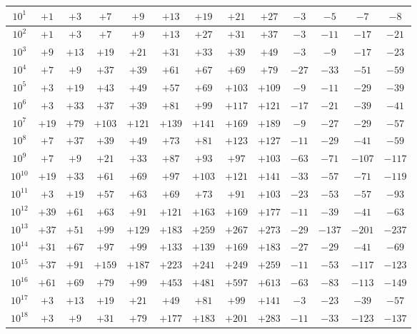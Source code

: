 \documentclass[12pt]{article}
\newcommand{\BeginConspect}{
  \pagestyle{fancy}
}
\begin{document}
\renewcommand{\dateseparator}{--}

\BeginConspect

\pagebreak

\begin{tabular}{|c|c|c|c|c|c|c|c|c|c|c|c|c|}
\hline
$10^{1}$ & $+1$ & $+3$ & $+7$ & $+9$ & $+13$ & $+19$ & $+21$ & $+27$ & $-3$ & $-5$ & $-7$ & $-8$ \\
\hline
$10^{2}$ & $+1$ & $+3$ & $+7$ & $+9$ & $+13$ & $+27$ & $+31$ & $+37$ & $-3$ & $-11$ & $-17$ & $-21$ \\
\hline
$10^{3}$ & $+9$ & $+13$ & $+19$ & $+21$ & $+31$ & $+33$ & $+39$ & $+49$ & $-3$ & $-9$ & $-17$ & $-23$ \\
\hline
$10^{4}$ & $+7$ & $+9$ & $+37$ & $+39$ & $+61$ & $+67$ & $+69$ & $+79$ & $-27$ & $-33$ & $-51$ & $-59$ \\
\hline
$10^{5}$ & $+3$ & $+19$ & $+43$ & $+49$ & $+57$ & $+69$ & $+103$ & $+109$ & $-9$ & $-11$ & $-29$ & $-39$ \\
\hline
$10^{6}$ & $+3$ & $+33$ & $+37$ & $+39$ & $+81$ & $+99$ & $+117$ & $+121$ & $-17$ & $-21$ & $-39$ & $-41$ \\
\hline
$10^{7}$ & $+19$ & $+79$ & $+103$ & $+121$ & $+139$ & $+141$ & $+169$ & $+189$ & $-9$ & $-27$ & $-29$ & $-57$ \\
\hline
$10^{8}$ & $+7$ & $+37$ & $+39$ & $+49$ & $+73$ & $+81$ & $+123$ & $+127$ & $-11$ & $-29$ & $-41$ & $-59$ \\
\hline
$10^{9}$ & $+7$ & $+9$ & $+21$ & $+33$ & $+87$ & $+93$ & $+97$ & $+103$ & $-63$ & $-71$ & $-107$ & $-117$ \\
\hline
$10^{10}$ & $+19$ & $+33$ & $+61$ & $+69$ & $+97$ & $+103$ & $+121$ & $+141$ & $-33$ & $-57$ & $-71$ & $-119$ \\
\hline
$10^{11}$ & $+3$ & $+19$ & $+57$ & $+63$ & $+69$ & $+73$ & $+91$ & $+103$ & $-23$ & $-53$ & $-57$ & $-93$ \\
\hline
$10^{12}$ & $+39$ & $+61$ & $+63$ & $+91$ & $+121$ & $+163$ & $+169$ & $+177$ & $-11$ & $-39$ & $-41$ & $-63$ \\
\hline
$10^{13}$ & $+37$ & $+51$ & $+99$ & $+129$ & $+183$ & $+259$ & $+267$ & $+273$ & $-29$ & $-137$ & $-201$ & $-237$ \\
\hline
$10^{14}$ & $+31$ & $+67$ & $+97$ & $+99$ & $+133$ & $+139$ & $+169$ & $+183$ & $-27$ & $-29$ & $-41$ & $-69$ \\
\hline
$10^{15}$ & $+37$ & $+91$ & $+159$ & $+187$ & $+223$ & $+241$ & $+249$ & $+259$ & $-11$ & $-53$ & $-117$ & $-123$ \\
\hline
$10^{16}$ & $+61$ & $+69$ & $+79$ & $+99$ & $+453$ & $+481$ & $+597$ & $+613$ & $-63$ & $-83$ & $-113$ & $-149$ \\
\hline
$10^{17}$ & $+3$ & $+13$ & $+19$ & $+21$ & $+49$ & $+81$ & $+99$ & $+141$ & $-3$ & $-23$ & $-39$ & $-57$ \\
\hline
$10^{18}$ & $+3$ & $+9$ & $+31$ & $+79$ & $+177$ & $+183$ & $+201$ & $+283$ & $-11$ & $-33$ & $-123$ & $-137$ \\
\hline
\end{tabular}
\end{document}
